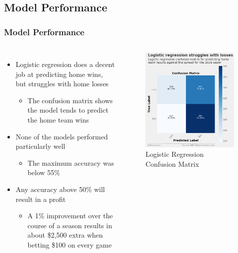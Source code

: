 \documentclass{beamer}
\begin{document}
\subsection{Model Performance}
\begin{frame}
\frametitle{Model Performance}
\begin{columns}
\begin{itemize}
    \item Logistic regression does a decent job at predicting home wins, but struggles with home losses
    \begin{itemize}
        \item The confusion matrix shows the model tends to predict the home team wins
    \end{itemize}
    \item None of the models performed particularly well
    \begin{itemize}
        \item The maximum accuracy was below 55\%
    \end{itemize}
    \item Any accuracy above 50\% will result in a profit
    \begin{itemize}
        \item A 1\% improvement over the course of a season results in about \$2,500 extra when betting \$100 on every game
    \end{itemize}
\end{itemize}
\begin{figure}
\includegraphics[scale=0.25]{../docs/assets/images/model-performance/logistic-regression-confusion-matrix.png}
\caption{Logistic Regression \\ Confusion Matrix\endtabular}
\end{figure}
\end{columns}
\end{frame}
\end{document}
